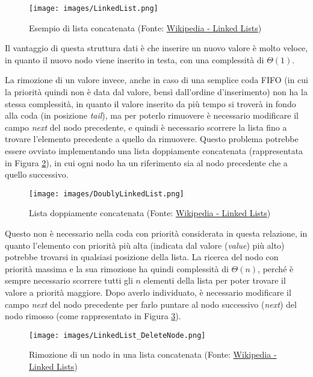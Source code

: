 \documentclass{article}
\begin{document}
\begin{figure}[h]
    \texttt{[image: images/LinkedList.png]}
    \centering
    \caption{Esempio di lista concatenata (Fonte: \href{https://en.wikipedia.org/wiki/Linked_list}{Wikipedia - Linked Lists})}
    \label{fig:linked_list}
\end{figure}

Il vantaggio di questa struttura dati è che inserire un nuovo valore è molto veloce, in quanto il nuovo nodo viene inserito in testa, con una complessità di $\Theta(1)$.

\vspace{5pt}
La rimozione di un valore invece, anche in caso di una semplice coda FIFO (in cui la priorità quindi non è data dal valore, bensì dall'ordine d'inserimento) non ha la stessa complessità, in quanto il valore inserito da più tempo si troverà in fondo alla coda (in posizione \emph{tail}), ma per poterlo rimuovere è necessario modificare il campo \emph{next} del nodo precedente, e quindi è necessario scorrere la lista fino a trovare l'elemento precedente a quello da rimuovere.
Questo problema potrebbe essere ovviato implementando una lista doppiamente concatenata (rappresentata in Figura \ref{fig:doubly_linked_list}), in cui ogni nodo ha un riferimento sia al nodo precedente che a quello successivo.

\begin{figure}[h]
    \texttt{[image: images/DoublyLinkedList.png]}
    \centering
    \caption{Lista doppiamente concatenata (Fonte: \href{https://en.wikipedia.org/wiki/Linked_list}{Wikipedia - Linked Lists})}
    \label{fig:doubly_linked_list}
\end{figure}

Questo non è necessario nella coda con priorità considerata in questa relazione, in quanto l'elemento con priorità più alta (indicata dal valore (\emph{value}) più alto) potrebbe trovarsi in qualsiasi posizione della lista.
La ricerca del nodo con priorità massima e la sua rimozione ha quindi complessità di $\Theta(n)$, perché è sempre necessario scorrere tutti gli $n$ elementi della lista per poter trovare il valore a priorità maggiore. Dopo averlo individuato, è necessario modificare il campo \emph{next} del nodo precedente per farlo puntare al nodo successivo (\emph{next}) del nodo rimosso (come rappresentato in Figura \ref{fig:linked_list_remove_node}).

\begin{figure}[h]
    \texttt{[image: images/LinkedList\_DeleteNode.png]}
    \centering
    \caption{Rimozione di un nodo in una lista concatenata (Fonte: \href{https://en.wikipedia.org/wiki/Linked_list}{Wikipedia - Linked Lists})}
    \label{fig:linked_list_remove_node}
\end{figure}
\end{document}
